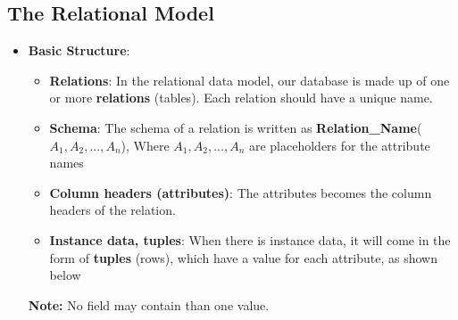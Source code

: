 \documentclass{report}
\begin{document}
    \subsection{The Relational Model}
    \begin{itemize}
        \item \textbf{Basic Structure}: 
            \begin{itemize}
                \item \textbf{Relations}: In the relational data model, our database is made up of one or more \textbf{relations} (tables). Each relation should have a unique name.
                \item \textbf{Schema}: The schema of a relation is written as \textbf{Relation\_Name}($A_{1}, A_{2}, ...,A_{n} $), Where $A_{1}, A_{2}, ...,A_{n}$ are placeholders for the attribute names
                \item \textbf{Column headers (attributes)}: The attributes becomes the column headers of the relation.
                \item \textbf{Instance data, tuples}: When there is instance data, it will come in the form of \textbf{tuples} (rows), which have a value for each attribute, as shown below
            \end{itemize}
            \bigbreak \noindent 
            \textbf{Note:} No field may contain than one value.


\end{itemize}
\end{document}
